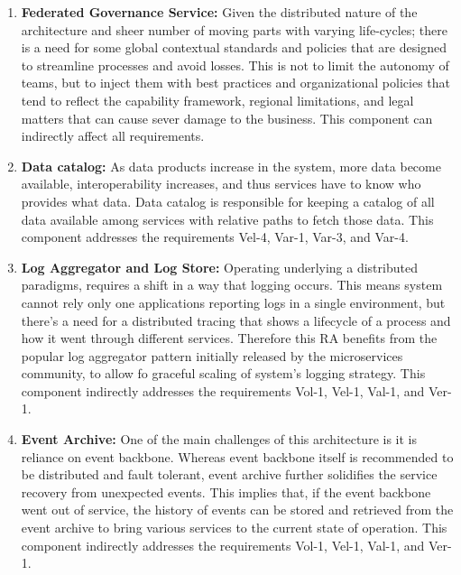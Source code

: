 \documentclass[conference]{IEEEtran}
\begin{document}
\begin{enumerate}
    \item \textbf{Federated Governance Service:} Given the distributed nature of the architecture and sheer number of moving parts with varying life-cycles; there is a need for some global contextual standards and policies that are designed to streamline processes and avoid losses. This is not to limit the autonomy of teams, but to inject them with best practices and organizational policies that tend to reflect the capability framework, regional limitations, and legal matters that can cause sever damage to the business. This component can indirectly affect all requirements.
    
    \item \textbf{Data catalog:} As data products increase in the system, more data become available, interoperability increases, and thus services have to know who provides what data. Data catalog is responsible for keeping a catalog of all data available among services with relative paths to fetch those data. This component addresses the requirements Vel-4, Var-1, Var-3, and Var-4.

    \item \textbf{Log Aggregator and Log Store:} Operating underlying a distributed paradigms, requires a shift in a way that logging occurs. This means system cannot rely only one applications reporting logs in a single environment, but there's a need for a distributed tracing that shows a lifecycle of a process and how it went through different services. Therefore this RA benefits from the popular log aggregator pattern initially released by the microservices community, to allow fo graceful scaling of system's logging strategy. This component indirectly addresses the requirements Vol-1, Vel-1, Val-1, and Ver-1. 
    
    \item \textbf{Event Archive:} One of the main challenges of this architecture is it is reliance on event backbone. Whereas event backbone itself is recommended to be distributed and fault tolerant, event archive further solidifies the service recovery from unexpected events. This implies that, if the event backbone went out of service, the history of events can be stored and retrieved from the event archive to bring various services to the current state of operation. This component indirectly addresses the requirements Vol-1, Vel-1, Val-1, and Ver-1. 


\end{enumerate}
\end{document}
